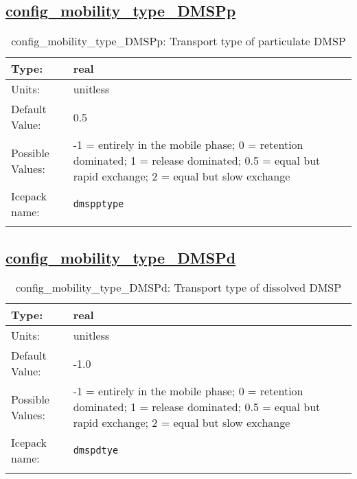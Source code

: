 \subsection[config\_mobility\_type\_DMSPp]{\hyperref[sec:nm_tab_biogeochemistry]{config\_mobility\_type\_DMSPp}}
\label{subsec:nm_sec_config_mobility_type_DMSPp}
\begin{center}
\begin{longtable}{| p{2.0in} || p{4.0in} |}
    \hline
    Type: & real \\
    \hline
    Units: & \si{unitless} \\
    \hline
    Default Value: & 0.5 \\
    \hline
    Possible Values: & -1 = entirely in the mobile phase; 0 = retention dominated; 1 = release dominated; 0.5 = equal but rapid exchange; 2 = equal but slow exchange \\
    \hline
    \hline
    Icepack name: & \verb+dmspptype+ \\
    \caption{config\_mobility\_type\_DMSPp: Transport type of particulate DMSP}
\end{longtable}
\end{center}
\subsection[config\_mobility\_type\_DMSPd]{\hyperref[sec:nm_tab_biogeochemistry]{config\_mobility\_type\_DMSPd}}
\label{subsec:nm_sec_config_mobility_type_DMSPd}
\begin{center}
\begin{longtable}{| p{2.0in} || p{4.0in} |}
    \hline
    Type: & real \\
    \hline
    Units: & \si{unitless} \\
    \hline
    Default Value: & -1.0 \\
    \hline
    Possible Values: & -1 = entirely in the mobile phase; 0 = retention dominated; 1 = release dominated; 0.5 = equal but rapid exchange; 2 = equal but slow exchange \\
    \hline
    \hline
    Icepack name: & \verb+dmspdtye+ \\
    \caption{config\_mobility\_type\_DMSPd: Transport type of dissolved DMSP}
\end{longtable}
\end{center}
